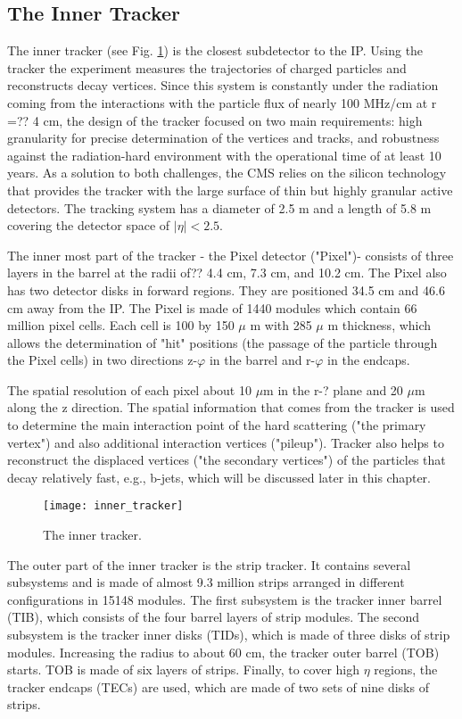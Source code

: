 \begin{normalsize}
\subsection{The Inner Tracker}

The inner tracker \cite{Tracker_phase2} (see Fig. \ref{inner_tracker}) is the closest subdetector to the IP. Using the tracker the experiment measures the trajectories of charged particles and reconstructs decay vertices. Since this system is constantly under the radiation coming from the interactions with the particle flux of nearly 100 MHz/cm at r =?? 4 cm, the design of the tracker focused on two main requirements: high granularity for precise determination of the vertices and tracks, and robustness against the radiation-hard environment with the operational time of at least 10 years. As a solution to both challenges, the CMS relies on the silicon technology that provides the tracker with the large surface of thin but highly granular active detectors. The tracking system has a diameter of 2.5 m and a length of 5.8 m covering the detector space of $|\eta|< 2.5$. 

The inner most part of the tracker - the Pixel detector ("Pixel")- consists of three layers in the barrel at the radii of?? 4.4 cm, 7.3 cm, and 10.2 cm. The Pixel also has two detector disks in forward regions. They are positioned 34.5 cm and 46.6 cm away from the IP. The Pixel is made of 1440 modules which contain 66 million pixel cells. Each cell is 100 by 150 $\mu$ m with 285 $\mu$ m thickness, which allows the determination of "hit" positions (the passage of the particle through the Pixel cells) in two directions z-$\varphi$ in the barrel and r-$\varphi$ in the endcaps.

The spatial resolution of each pixel about 10 $\mu$m in the r-? plane and 20 $\mu$m along the z direction. The spatial information that comes from the tracker is used to determine the main interaction point of the hard scattering ("the primary vertex") and also additional interaction vertices ("pileup"). Tracker also helps to reconstruct the displaced vertices ("the secondary vertices") of the particles that decay relatively fast, e.g., b-jets, which will be discussed later in this chapter. 

\begin{figure}[h!]
  \centering
  \texttt{[image: inner\_tracker]}
  \caption[The inner tracker]{The inner tracker.}
  \label{inner_tracker}
\end{figure}


The outer part of the inner tracker is the strip tracker. It contains several subsystems and is made of almost 9.3 million strips arranged in different configurations in 15148 modules. The first subsystem is the tracker inner barrel (TIB), which consists of the four barrel layers of strip modules. The second subsystem is the tracker inner disks (TIDs), which is made of three disks of strip modules. Increasing the radius to about 60 cm, the tracker outer barrel (TOB) starts. TOB is made of six layers of strips. Finally, to cover high $\eta$ regions, the tracker endcaps (TECs) are used, which are made of two sets of nine disks of strips. 


\end{normalsize}
